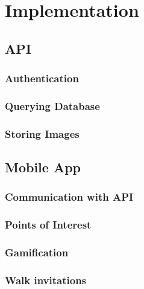 \chapter{Implementation}


\section{API}

\subsection{Authentication}

\subsection{Querying Database}

\subsection{Storing Images} \label{implentation:storing-images}


\section{Mobile App}

\subsection{Communication with API}

\subsection{Points of Interest}

\subsection{Gamification} \label{subsection:gamification}


\subsection{Walk invitations}